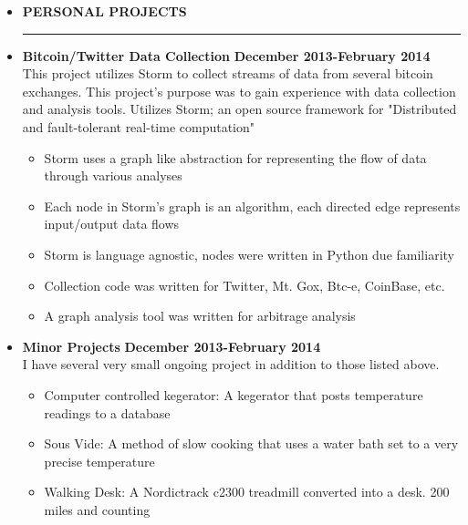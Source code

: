 \documentclass[overlapped]{res}
\begin{document}
\begin{resume}
\begin{itemize}[leftmargin=0in]
    \item[] \textbf{PERSONAL PROJECTS} \\[-0.1in] \rule{\textwidth}{0.5pt}
            \item[] 
                \begin{samepage}
                    \textbf{Bitcoin/Twitter Data Collection} \hfill \textbf{December 2013-February 2014} \\
                    This project utilizes Storm to collect streams of data from several bitcoin exchanges. This 
                    project's purpose was to gain experience with data collection and analysis tools. Utilizes 
                    Storm; an open source framework for "Distributed and fault-tolerant real-time computation"
                    \begin{itemize}
                        \item[\textbullet] Storm uses a graph like abstraction for representing the flow of data through various analyses
                        \item[\textbullet] Each node in Storm's graph is an algorithm, each directed edge represents input/output data flows
                        \item[\textbullet] Storm is language agnostic, nodes were written in Python due familiarity
                        \item[\textbullet] Collection code was written for Twitter, Mt. Gox, Btc-e, CoinBase, etc.
                        \item[\textbullet] A graph analysis tool was written for arbitrage analysis
                    \end{itemize}
                \end{samepage}
            \item[] 
                \begin{samepage}
                    \textbf{Minor Projects} \hfill \textbf{December 2013-February 2014} \\
                    I have several very small ongoing project in addition to those listed above.
                    \begin{itemize}
                        \item[\textbullet] Computer controlled kegerator:  A kegerator that posts temperature readings to a database
                        \item[\textbullet] Sous Vide:  A method of slow cooking that uses a water bath set to a very precise temperature
                        \item[\textbullet] Walking Desk:  A Nordictrack c2300 treadmill converted into a desk. 200 miles and counting
                    \end{itemize}
                \end{samepage}
\end{itemize}
\vspace{0.25in}


\end{resume}
\end{document}
